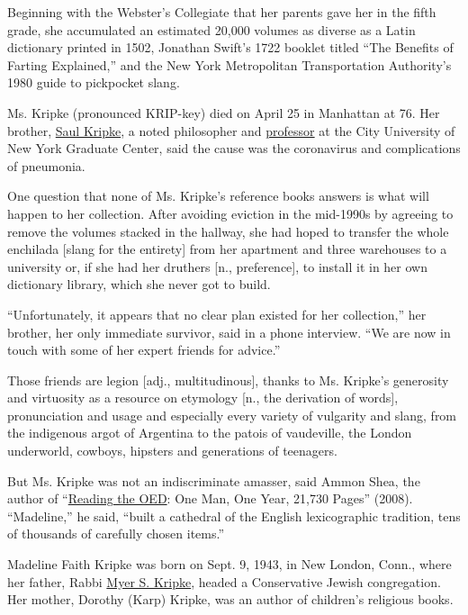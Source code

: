 Beginning with the Webster's Collegiate that her parents gave her in the
fifth grade, she accumulated an estimated 20,000 volumes as diverse as a
Latin dictionary printed in 1502, Jonathan Swift's 1722 booklet titled
``The Benefits of Farting Explained,'' and the New York Metropolitan
Transportation Authority's 1980 guide to pickpocket slang.

Ms. Kripke (pronounced KRIP-key) died on April 25 in Manhattan at 76.
Her brother,
\href{https://www.nytimes3xbfgragh.onion/2006/01/28/books/philosopher-65-lectures-not-about-what-am-i-but-what-is-i.html}{Saul
Kripke}, a noted philosopher and
\href{https://www.britannica.com/biography/Saul-Kripke}{professor} at
the City University of New York Graduate Center, said the cause was the
coronavirus and complications of pneumonia.

One question that none of Ms. Kripke's reference books answers is what
will happen to her collection. After avoiding eviction in the mid-1990s
by agreeing to remove the volumes stacked in the hallway, she had hoped
to transfer the whole enchilada {[}slang for the entirety{]} from her
apartment and three warehouses to a university or, if she had her
druthers {[}n., preference{]}, to install it in her own dictionary
library, which she never got to build.

``Unfortunately, it appears that no clear plan existed for her
collection,'' her brother, her only immediate survivor, said in a phone
interview. ``We are now in touch with some of her expert friends for
advice.''

Those friends are legion {[}adj., multitudinous{]}, thanks to Ms.
Kripke's generosity and virtuosity as a resource on etymology {[}n., the
derivation of words{]}, pronunciation and usage and especially every
variety of vulgarity and slang, from the indigenous argot of Argentina
to the patois of vaudeville, the London underworld, cowboys, hipsters
and generations of teenagers.

But Ms. Kripke was not an indiscriminate amasser, said Ammon Shea, the
author of
``\href{https://www.nytimes3xbfgragh.onion/2008/08/03/books/review/Baker-t.html}{Reading
the OED}: One Man, One Year, 21,730 Pages'' (2008). ``Madeline,'' he
said, ``built a cathedral of the English lexicographic tradition, tens
of thousands of carefully chosen items.''

Madeline Faith Kripke was born on Sept. 9, 1943, in New London, Conn.,
where her father, Rabbi
\href{https://www.nytimes3xbfgragh.onion/2014/05/04/us/rabbi-myer-kripke-100-early-buffett-friend-and-investor-dies.html}{Myer
S. Kripke}, headed a Conservative Jewish congregation. Her mother,
Dorothy (Karp) Kripke, was an author of children's religious books.

